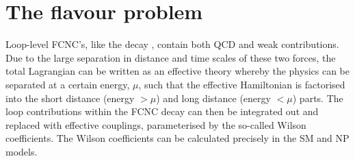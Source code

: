 \section{The flavour problem}
\label{subsec:mfv}
Loop-level FCNC's, like the decay \Lbpi, contain both QCD and weak contributions. Due to the large separation in distance and time scales of these two forces, the total Lagrangian can be written as an effective theory whereby the physics can be separated at a certain energy, $\mu$, such that the effective Hamiltonian is factorised into the short distance (energy $>\mu$) and long distance (energy $<\mu$) parts. The loop contributions within the FCNC decay can then be integrated out and replaced with effective couplings, parameterised by the so-called Wilson coefficients. The Wilson coefficients can be calculated precisely in the SM and \Gls{NP} models. %

